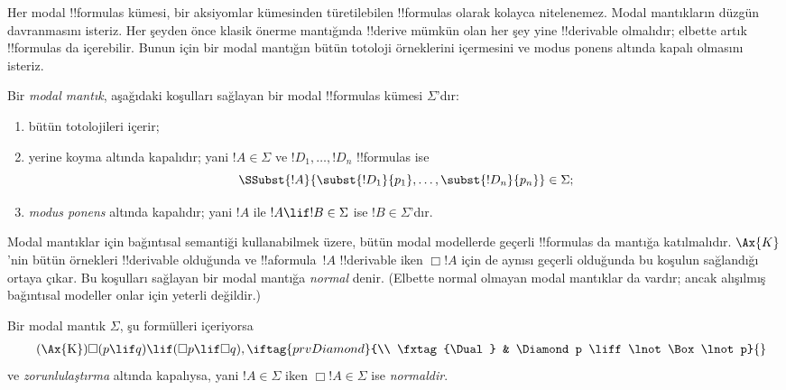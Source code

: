 



Her modal !!{formula}s kümesi, bir aksiyomlar kümesinden türetilebilen
!!{formula}s olarak kolayca nitelenemez. Modal mantıkların düzgün davranmasını
isteriz. Her şeyden önce klasik önerme mantığında !!{derive} mümkün olan her
şey yine !!{derivable} olmalıdır; elbette artık !!{formula}s
 da içerebilir. Bunun için bir modal mantığın bütün totoloji
örneklerini içermesini ve modus ponens altında kapalı olmasını isteriz.

\begin{defn}
  Bir \emph{modal mantık}, aşağıdaki koşulları sağlayan bir modal
  !!{formula}s kümesi $\Sigma$'dır:
  \begin{enumerate}
  \item bütün totolojileri içerir;
  \item yerine koyma altında kapalıdır; yani $!A\in\Sigma$ ve
    $!D_1,\dots,!D_n$ !!{formula}s ise
    \[
    \SSubst{!A}{\subst{!D_1}{p_1}, \dots, \subst{!D_n}{p_n}} \in \Sigma;
    \]
  \item \emph{modus ponens} altında kapalıdır; yani $!A$ ile
    $!A\lif !B\in\Sigma$ ise $!B\in\Sigma$'dır.
  \end{enumerate}
\end{defn}

Modal mantıklar için bağıntısal semantiği kullanabilmek üzere, bütün modal
modellerde geçerli !!{formula}s da mantığa katılmalıdır.
$\Ax{K}$'nin bütün örnekleri
!!{derivable} olduğunda ve !!a{formula}~$!A$ !!{derivable} iken $\Box !A$
için de aynısı geçerli olduğunda bu koşulun sağlandığı ortaya çıkar. Bu koşulları
sağlayan bir modal mantığa \emph{normal} denir. (Elbette normal olmayan
modal mantıklar da vardır; ancak alışılmış bağıntısal modeller onlar için
yeterli değildir.)

\begin{defn}
  Bir modal mantık $\Sigma$, şu formülleri içeriyorsa
  \begin{align*}
    \tag{\Ax{K}} & \Box(p \lif q) \lif (\Box p \lif \Box q),
    \iftag{prvDiamond}{\\
      \tag{\Dual} & \Diamond p \liff \lnot\Box\lnot p}{}
  \end{align*}
  ve \emph{zorunlulaştırma} altında kapalıysa, yani $!A\in\Sigma$ iken
  $\Box !A\in\Sigma$ ise \emph{normaldir}.
\end{defn}

